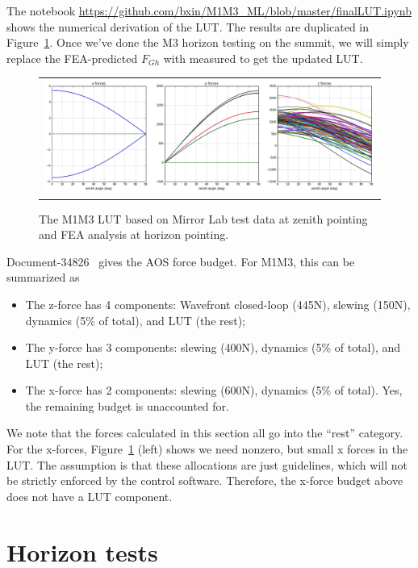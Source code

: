 \documentclass [twoside,openbib,12pt]{article}
\newcommand{\bitm}{\begin{itemize}}
\newcommand{\eitm}{\end{itemize}}
\begin{document}
The notebook
\url{https://github.com/bxin/M1M3_ML/blob/master/finalLUT.ipynb} shows
the numerical derivation of the LUT. The results are duplicated in
Figure~\ref{fig:LUT}. Once we've done the M3 horizon testing on the
summit, we will simply replace the FEA-predicted $F_{Gh}$ with
measured to get the updated LUT.


 \begin{figure}[bthp]
   \begin{center}
     \begin{tabular}{c}
\includegraphics[width=170mm]{figures/LUT.png}
  \end{tabular}
   \end{center}
   \caption
   { \label{fig:LUT}
 The M1M3 LUT based on Mirror Lab test data at zenith pointing and FEA
 analysis at horizon pointing.
 }
\end{figure}

Document-34826~\cite{m1m3m2fbudget} gives the AOS force budget. For M1M3, this can be
summarized as
\bitm
\item The z-force has 4 components: Wavefront closed-loop (445N),
  slewing (150N), dynamics (5\% of total), and LUT (the rest);
\item The y-force has 3 components: slewing (400N), dynamics (5\% of
  total), and LUT (the rest);
  \item The x-force has 2 components: slewing (600N), dynamics (5\% of
    total). Yes, the remaining budget is unaccounted for. 
  \eitm
  We note that the forces calculated in this section all go into the
  ``rest'' category. For the x-forces, 
    Figure~\ref{fig:LUT} (left) shows we need nonzero, but small x
    forces in the LUT. The assumption is that these allocations are
    just guidelines, which will 
    not be strictly enforced by the control software. 
    Therefore, the x-force budget above does not have a LUT component.
    
\section{Horizon tests}
\label{sec:horizon}
\end{document}
